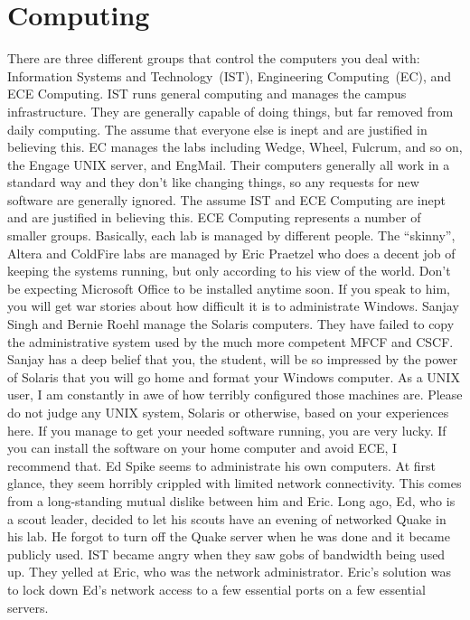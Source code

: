 \documentclass{book}
\begin{document}
\section{Computing}\label{sec:computing}
There are three different groups that control the computers you deal with: Information Systems and Technology~(IST), Engineering Computing~(EC), and ECE Computing. IST runs general computing and manages the campus infrastructure. They are generally capable of doing things, but far removed from daily computing. The assume that everyone else is inept and are justified in believing this. EC manages the labs including Wedge, Wheel, Fulcrum, and so on, the Engage UNIX server, and EngMail. Their computers generally all work in a standard way and they don't like changing things, so any requests for new software are generally ignored. The assume IST and ECE Computing are inept and are justified in believing this. ECE Computing represents a number of smaller groups. Basically, each lab is managed by different people. The ``skinny'', Altera and ColdFire labs are managed by Eric Praetzel who does a decent job of keeping the systems running, but only according to his view of the world. Don't be expecting Microsoft Office to be installed anytime soon. If you speak to him, you will get war stories about how difficult it is to administrate Windows. Sanjay Singh and Bernie Roehl manage the Solaris computers. They have failed to copy the administrative system used by the much more competent MFCF and CSCF. Sanjay has a deep belief that you, the student, will be so impressed by the power of Solaris that you will go home and format your Windows computer. As a UNIX user, I am constantly in awe of how terribly configured those machines are. Please do not judge any UNIX system, Solaris or otherwise, based on your experiences here. If you manage to get your needed software running, you are very lucky. If you can install the software on your home computer and avoid ECE, I recommend that. Ed Spike seems to administrate his own computers. At first glance, they seem horribly crippled with limited network connectivity. This comes from a long-standing mutual dislike between him and Eric. Long ago, Ed, who is a scout leader, decided to let his scouts have an evening of networked Quake in his lab. He forgot to turn off the Quake server when he was done and it became publicly used. IST became angry when they saw gobs of bandwidth being used up. They yelled at Eric, who was the network administrator. Eric's solution was to lock down Ed's network access to a few essential ports on a few essential servers.
\end{document}
